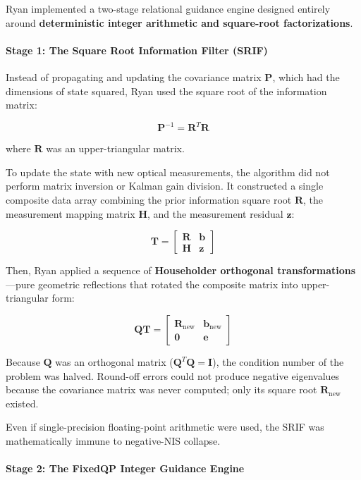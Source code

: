 \documentclass[12pt,twoside,openright]{book}
\begin{document}
Ryan implemented a two-stage relational guidance engine designed
entirely around \textbf{deterministic integer arithmetic and square-root
factorizations}.

\paragraph{Stage 1: The Square Root Information Filter
(SRIF)}\label{stage-1-the-square-root-information-filter-srif}

Instead of propagating and updating the covariance matrix
\(\mathbf{P}\), which had the dimensions of state squared, Ryan used the
square root of the information matrix:

\[\mathbf{P}^{-1} = \mathbf{R}^T \mathbf{R}\]

where \(\mathbf{R}\) was an upper-triangular matrix.

To update the state with new optical measurements, the algorithm did not
perform matrix inversion or Kalman gain division. It constructed a
single composite data array combining the prior information square root
\(\mathbf{R}\), the measurement mapping matrix \(\mathbf{H}\), and the
measurement residual \(\mathbf{z}\):

\[\mathbf{T} = \begin{bmatrix} \mathbf{R} & \mathbf{b} \\ \mathbf{H} & \mathbf{z} \end{bmatrix}\]

Then, Ryan applied a sequence of \textbf{Householder orthogonal
transformations}---pure geometric reflections that rotated the composite
matrix into upper-triangular form:

\[\mathbf{Q} \mathbf{T} = \begin{bmatrix} \mathbf{R}_{\text{new}} & \mathbf{b}_{\text{new}} \\ \mathbf{0} & \mathbf{e} \end{bmatrix}\]

Because \(\mathbf{Q}\) was an orthogonal matrix
(\(\mathbf{Q}^T \mathbf{Q} = \mathbf{I}\)), the condition number of the
problem was halved. Round-off errors could not produce negative
eigenvalues because the covariance matrix was never computed; only its
square root \(\mathbf{R}_{\text{new}}\) existed.

Even if single-precision floating-point arithmetic were used, the SRIF
was mathematically immune to negative-NIS collapse.

\paragraph{Stage 2: The FixedQP Integer Guidance
Engine}\label{stage-2-the-fixedqp-integer-guidance-engine}
\end{document}
